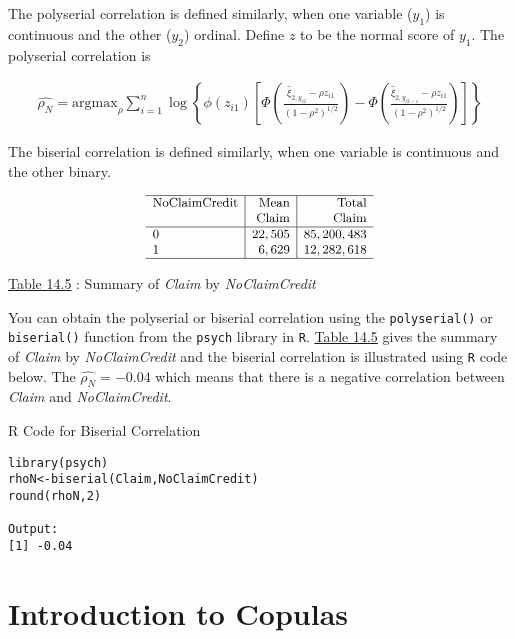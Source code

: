 \documentclass[]{book}
\theoremstyle{definition}
\theoremstyle{definition}
\theoremstyle{definition}
\theoremstyle{remark}
\begin{document}
The polyserial correlation is defined similarly, when one variable
(\(y_1\)) is continuous and the other (\(y_2\)) ordinal. Define \(z\) to
be the normal score of \(y_1\). The polyserial correlation is

\begin{eqnarray*}
\hat{\rho_N} = \text{argmax}_{\rho}
\sum_{i=1}^n \log\left\{ \phi(z_{i1})\left[
\Phi(\frac{\hat{\xi}_{2,y_{i2}} - \rho z_{i1}}
{(1-\rho^2)^{1/2}})
-\Phi(\frac{\hat{\xi}_{2,y_{i2-1}} - \rho z_{i1}}
{(1-\rho^2)^{1/2}})
\right]
\right\}
\end{eqnarray*}

The biserial correlation is defined similarly, when one variable is
continuous and the other binary.

\[
{\small \begin{matrix}
\begin{array}{l|r|r} 
    \hline
\text{NoClaimCredit} & \text{Mean}     &\text{Total}       \\
 & \text{Claim}     &\text{Claim}       \\
  \hline
          0  & 22,505  &  85,200,483   \\
          1  &    6,629 &  12,282,618 \\
   \hline
\end{array}
\end{matrix}}
\]

\protect\hyperlink{tab:14.5}{Table 14.5} : Summary of \emph{Claim} by
\emph{NoClaimCredit}

You can obtain the polyserial or biserial correlation using the
\texttt{polyserial()} or \texttt{biserial()} function from the
\texttt{psych} library in \texttt{R}. \protect\hyperlink{tab:14.5}{Table
14.5} gives the summary of \emph{Claim} by \emph{NoClaimCredit} and the
biserial correlation is illustrated using \texttt{R} code below. The
\(\hat{\rho_N}=-0.04\) which means that there is a negative correlation
between \emph{Claim} and \emph{NoClaimCredit}.

R Code for Biserial Correlation

\hypertarget{display.bis.2}{}
\begin{verbatim}
library(psych)
rhoN<-biserial(Claim,NoClaimCredit)
round(rhoN,2)

Output:
[1] -0.04
\end{verbatim}

\section{Introduction to Copulas}\label{S:Copula}
\end{document}
